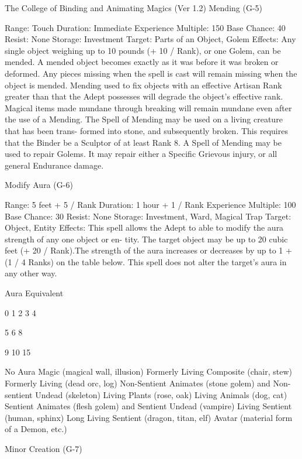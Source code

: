 \begin{Chapter}{The College of Binding and Animating Magics (Ver 1.2)}
Mending (G-5) 

Range: Touch 
Duration: Immediate 
Experience Multiple: 150 
Base Chance: 40%
Resist: None 
Storage: Investment 
Target: Parts of an Object, Golem 
Effects:  Any  single  object  weighing  up  to  10 
pounds  (+  10  /  Rank),  or  one  Golem,  can  be 
mended.  A  mended  object  becomes  exactly  as  it 
was before it was broken or deformed. Any pieces 
missing when the spell is cast will remain missing 
when  the  object  is  mended.  Mending  used  to  fix 
objects with an effective Artisan Rank greater than 
that  the  Adept  possesses  will  degrade  the  object’s 
effective  rank.  Magical  items  made  mundane 
through  breaking  will  remain  mundane  even  after 
the  use  of  a  Mending.  The  Spell  of  Mending  may 
be  used  on  a  living  creature  that  has  been  trans-
formed  into  stone,  and  subsequently  broken.  This 
requires  that  the  Binder  be  a  Sculptor  of  at  least 
Rank 8. A Spell of Mending may be used to repair 
Golems.  It  may  repair  either  a  Specific  Grievous 
injury, or all general Endurance damage. 

Modify Aura (G-6) 

Range: 5 feet + 5 / Rank 
Duration: 1 hour + 1 / Rank 
Experience Multiple: 100 
Base Chance: 30%
Resist: None 
Storage: Investment, Ward, Magical Trap 
Target: Object, Entity 
Effects:  This  spell  allows  the  Adept  to  able  to 
modify  the  aura  strength  of  any  one  object  or  en-
tity. The target object may be up to 20 cubic feet (+ 
20  /  Rank).The  strength  of  the  aura  increases  or 
decreases  by  up  to  1  +  (1  /  4  Ranks)  on  the  table 
below. This spell does not alter the target’s aura in 
any other way. 

Aura  Equivalent 

0 
1 
2 
3 
4 

5 
6 
8 

9 
10 
15 

No Aura 
Magic (magical wall, illusion) 
Formerly Living Composite (chair, stew) 
Formerly Living (dead orc, log) 
Non-Sentient Animates (stone golem) and 
Non-sentient Undead (skeleton) 
Living Plants (rose, oak) 
Living Animals (dog, cat) 
Sentient Animates (flesh golem) and 
Sentient Undead (vampire) 
Living Sentient (human, sphinx) 
Long Living Sentient (dragon, titan, elf) 
Avatar (material form of a Demon, etc.) 

Minor Creation (G-7) 


\end{Chapter}
